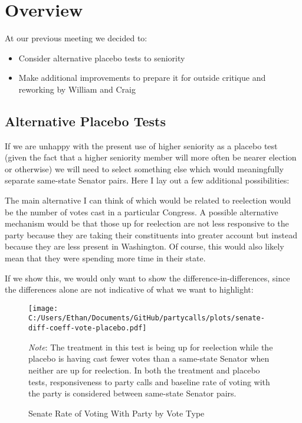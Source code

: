 \documentclass[12pt]{article}
\newcommand\fnote[1]{\captionsetup{font=small}\caption*{#1}}
\begin{document}
\section{Overview}

At our previous meeting we decided to:

\begin{itemize}
	\item Consider alternative placebo tests to seniority
	
	\item Make additional improvements to prepare it for outside critique and reworking by William and Craig
\end{itemize}

\subsection{Alternative Placebo Tests}

If we are unhappy with the present use of higher seniority as a placebo test (given the fact that a higher seniority member will more often be nearer election or otherwise) we will need to select something else which would meaningfully separate same-state Senator pairs. Here I lay out a few additional possibilities:

The main alternative I can think of which would be related to reelection would be the number of votes cast in a particular Congress. A possible alternative mechanism would be that those up for reelection are not less responsive to the party because they are taking their constituents into greater account but instead because they are less present in Washington. Of course, this would also likely mean that they were spending more time in their state.

If we show this, we would only want to show the difference-in-differences, since the differences alone are not indicative of what we want to highlight:

\begin{figure}[H]
	\centering
	\caption{Senate Rate of Voting With Party by Vote Type}
	\texttt{[image: C:/Users/Ethan/Documents/GitHub/partycalls/plots/senate-diff-coeff-vote-placebo.pdf]}
	\fnote{\textit{Note}: The treatment in this test is being up for reelection while the placebo is having cast fewer votes than a same-state Senator when neither are up for reelection. In both the treatment and placebo tests, responsiveness to party calls and baseline rate of voting with the party is considered between same-state Senator pairs.}
\end{figure}
\end{document}
